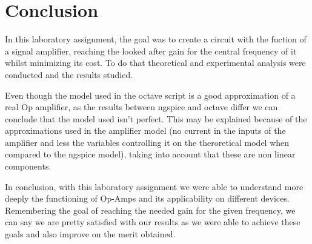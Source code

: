 \section{Conclusion}
\label{sec:conclusion}

\par In this laboratory assignment, the goal was to create a circuit with the fuction of a signal amplifier, reaching the looked after gain for the central frequency of it whilst minimizing its cost. To do that theoretical and experimental analysis were conducted and the results studied.

\par Even though the model used in the octave script is a good approximation of a real Op amplifier, as the results between ngspice and octave differ  we can conclude that the model used isn't perfect. This may be explained because of the approximations used in the amplifier model (no current in the inputs of the amplifier and less the variables controlling it on the theroretical model when compared to the ngspice model), taking into account that these are non linear components. 
 
\par In conclusion, with this laboratory assignment we were able to understand more deeply the functioning of Op-Amps and its applicability on different devices. Remembering the goal of reaching the needed gain for the given frequency, we can say we are pretty satisfied with our results as we were able to achieve these goals and also improve on the merit obtained.







